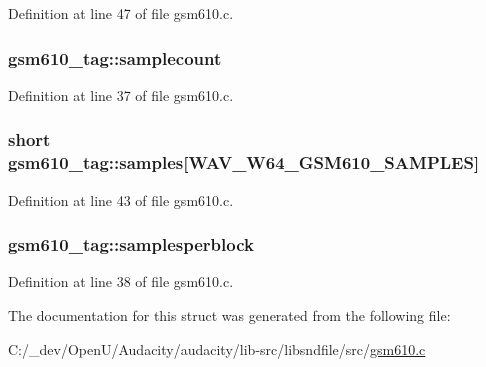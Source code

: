 Definition at line 47 of file gsm610.\+c.

\subsubsection[{\texorpdfstring{samplecount}{samplecount}}]{ gsm610\+\_\+tag\+::samplecount}\hypertarget{structgsm610__tag_a6d95670fdec1593066579e2ce52dbbad}{}\label{structgsm610__tag_a6d95670fdec1593066579e2ce52dbbad}


Definition at line 37 of file gsm610.\+c.

\subsubsection[{\texorpdfstring{samples}{samples}}]{\setlength{\rightskip}{0pt plus 5cm}short gsm610\+\_\+tag\+::samples\mbox{[}{\bf W\+A\+V\+\_\+\+W64\+\_\+\+G\+S\+M610\+\_\+\+S\+A\+M\+P\+L\+ES}\mbox{]}}\hypertarget{structgsm610__tag_aadeef70999282aa6fe491c820f93027a}{}\label{structgsm610__tag_aadeef70999282aa6fe491c820f93027a}


Definition at line 43 of file gsm610.\+c.

\subsubsection[{\texorpdfstring{samplesperblock}{samplesperblock}}]{ gsm610\+\_\+tag\+::samplesperblock}\hypertarget{structgsm610__tag_a5b20073af371ad9d92d70fee31ef1e6f}{}\label{structgsm610__tag_a5b20073af371ad9d92d70fee31ef1e6f}


Definition at line 38 of file gsm610.\+c.



The documentation for this struct was generated from the following file\+:\begin{DoxyCompactItemize}
\item 
C\+:/\+\_\+dev/\+Open\+U/\+Audacity/audacity/lib-\/src/libsndfile/src/\hyperlink{gsm610_8c}{gsm610.\+c}\end{DoxyCompactItemize}

